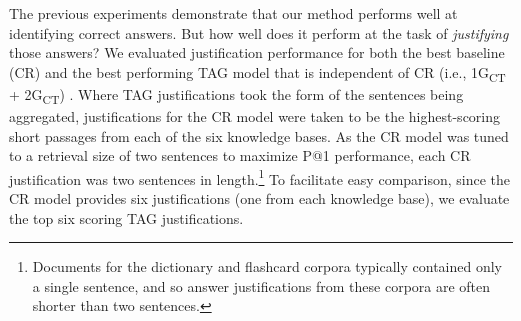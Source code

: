 {%
%
%
%

The previous experiments demonstrate that our method performs well at identifying correct answers. But how well does it perform at the task of {\em justifying} those answers?
We evaluated justification performance for both the best baseline (CR) and the best performing TAG model that is independent of CR (i.e., 1G\textsubscript{CT} + 2G\textsubscript{CT}) .  Where TAG justifications took the form of the sentences being aggregated, justifications for the CR model were taken to be the highest-scoring short passages from each of the six knowledge bases.  As the CR model was tuned to a retrieval size of two sentences to maximize P@1 performance, each CR justification was two sentences in length.\footnote{Documents for the dictionary and flashcard corpora typically contained only a single sentence, and so answer justifications from these corpora are often shorter than two sentences.} To facilitate easy comparison, since the CR model provides six justifications (one from each knowledge base), we evaluate the top six scoring TAG justifications.  

}
